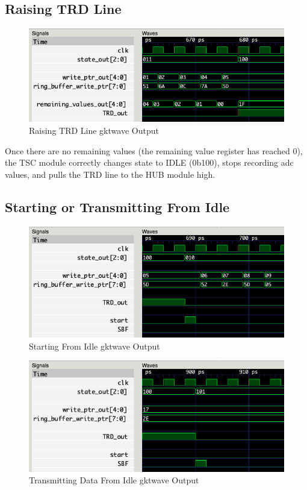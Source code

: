 \subsection{Raising TRD Line}
\begin{figure}[H]
    \centering
    \includegraphics[width=\columnwidth]{Figures/E16captured}
    \caption{Raising TRD Line gktwave Output}
    \label{fig:testE}
\end{figure}

Once there are no remaining values (the remaining value register has reached 0), the TSC module correctly changes state to IDLE (0b100), stops recording adc values, and pulls the TRD line to the HUB module high.

\subsection{Starting or Transmitting From Idle}
\begin{figure}[H]
    \centering
    \includegraphics[width=\columnwidth]{Figures/Fidle_start}
    \caption{Starting From Idle gktwave Output}
    \label{fig:testF}
\end{figure}
\begin{figure}[H]
    \centering
    \includegraphics[width=\columnwidth]{Figures/Gidle_SBF}
    \caption{Transmitting Data From Idle gktwave Output}
    \label{fig:testG}
\end{figure}

